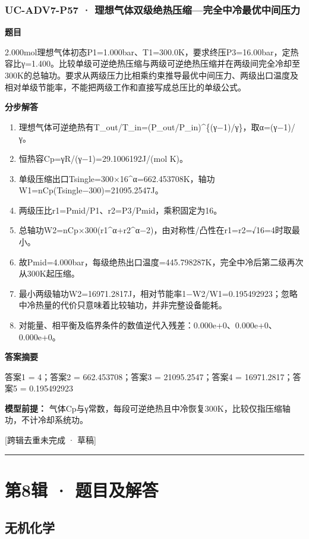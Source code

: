 \documentclass[UTF8,11pt,a4paper]{ctexart}
\begin{document}
\subsubsection*{UC-ADV7-P57 · 理想气体双级绝热压缩—完全中冷最优中间压力}
\noindent\textbf{题目}\par
2.000mol理想气体初态P1=1.000bar、T1=300.0K，要求终压P3=16.00bar，定热容比γ=1.400。比较单级可逆绝热压缩与两级可逆绝热压缩并在两级间完全冷却至300K的总轴功。要求从两级压力比相乘约束推导最优中间压力、两级出口温度及相对单级节能率，不能把两级工作和直接写成总压比的单级公式。\par
\medskip\noindent\textbf{分步解答}
\begin{enumerate}
\item 理想气体可逆绝热有T\_out/T\_in=(P\_out/P\_in)\textasciicircum{}\{(γ−1)/γ\}，取α=(γ−1)/γ。
\item 恒热容Cp=γR/(γ−1)=29.1006192J/(mol K)。
\item 单级压缩出口Tsingle=300×16\textasciicircum{}α=662.453708K，轴功W1=nCp(Tsingle−300)=21095.2547J。
\item 两级压比r1=Pmid/P1、r2=P3/Pmid，乘积固定为16。
\item 总轴功W2=nCp×300(r1\textasciicircum{}α+r2\textasciicircum{}α−2)，由对称性/凸性在r1=r2=√16=4时取最小。
\item 故Pmid=4.000bar，每级绝热出口温度=445.798287K，完全中冷后第二级再次从300K起压缩。
\item 最小两级轴功W2=16971.2817J，相对节能率1−W2/W1=0.195492923；忽略中冷热量的代价只意味着比较轴功，并非完整设备能耗。
\item 对能量、相平衡及临界条件的数值逆代入残差：0.000e+0、0.000e+0、0.000e+0。
\end{enumerate}
\noindent\textbf{答案摘要}\par
答案1 = 4；答案2 = 662.453708；答案3 = 21095.2547；答案4 = 16971.2817；答案5 = 0.195492923\par
\noindent\textbf{模型前提：}
气体Cp与γ常数，每段可逆绝热且中冷恢复300K，比较仅指压缩轴功，不计冷却系统功。\par
\noindent\textcolor{red!65!black}{[跨辑去重未完成 · 草稿]} \par
\medskip\hrule\medskip
\clearpage
\section*{第8辑 · 题目及解答}
\subsection*{无机化学}
\end{document}
